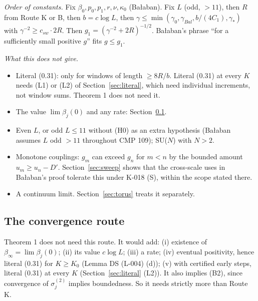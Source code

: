 \emph{Order of constants.} Fix $\beta_0,p_0,p_1,r,\nu,\kappa_0$ (Ba{\l}aban). Fix $L$ (odd, $>11$), then $R$ from Route K or B, then $b=c\log L$, then $\gamma\le\min(\gamma_0,\gamma_{Bal},b/(4C_1),\gamma_*)$ with $\gamma^{-2}\ge c_{sw}\cdot2R$. Then $g_1=(\gamma^{-2}+2R)^{-1/2}$. Ba{\l}aban's phrase ``for a sufficiently small positive $g$'' fits $g\le g_1$.

\emph{What this does not give.}
\begin{itemize}
\item Literal (0.31): only for windows of length $\ge8R/b$. Literal (0.31) at every $K$ needs (L1) or (L2) of Section~\ref{sec:literal}, which need individual increments, not window sums. Theorem 1 does not need it.
\item The value $\lim\beta_j(0)$ and any rate: Section~\ref{sec:convergence}.
\item Even $L$, or odd $L\le11$ without (H0) as an extra hypothesis (Ba{\l}aban assumes $L$ odd $>11$ throughout CMP 109); SU($N$) with $N>2$.
\item Monotone couplings: $g_m$ can exceed $g_n$ for $m<n$ by the bounded amount $u_m\ge u_n-D'$. Section~\ref{sec:sweep} shows that the cross-scale uses in Ba{\l}aban's proof tolerate this under K-018 (S), within the scope stated there.
\item A continuum limit. Section~\ref{sec:torus} treats it separately.
\end{itemize}

\subsection{The convergence route}\label{sec:convergence}

Theorem 1 does not need this route. It would add: (i) existence of $\beta_\infty=\lim\beta_j(0)$; (ii) its value $c\log L$; (iii) a rate; (iv) eventual positivity, hence literal (0.31) for $K\ge K_0$ (Lemma DS (L-004) (d)); (v) with certified early steps, literal (0.31) at every $K$ (Section~\ref{sec:literal} (L2)). It also implies (B2), since convergence of $\sigma_j^{(2)}$ implies boundedness. So it needs strictly more than Route K.

